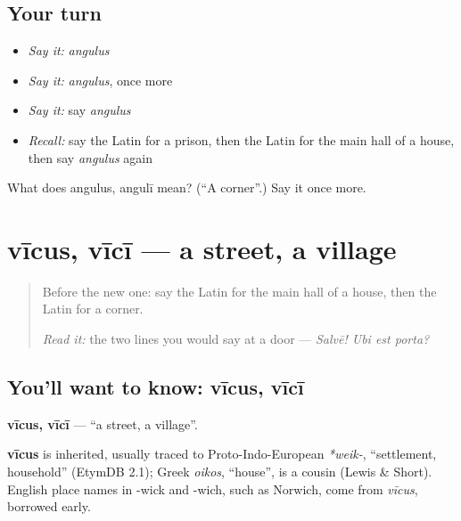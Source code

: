 \subsection*{Your turn}
\begin{itemize}
\raggedright
  \item \emph{Say it:} \emph{angulus}
  \item \emph{Say it:} \emph{angulus}, once more
  \item \emph{Say it:} say \emph{angulus}
  \item \emph{Recall:} say the Latin for a prison, then the Latin for the main hall of a house, then say \emph{angulus} again
\end{itemize}

\begin{tcolorbox}[breakable,colback=teal!4,colframe=teal!35!black,title={Before you move on}]
What does angulus, angulī mean? (\textquotedblleft{}A corner\textquotedblright{}.) Say it once more.
\end{tcolorbox}
\section[vīcus, vīcī]{vīcus, vīcī — a street, a village}

\label{lesson:LA-C116-vicus}



\begin{quote}
Before the new one: say the Latin for the main hall of a house, then the Latin for a corner.

\emph{Read it:} the two lines you would say at a door — \emph{Salvē! Ubi est porta?}
\end{quote}

\subsection*{You'll want to know: vīcus, vīcī}
\textbf{vīcus, vīcī} — \textquotedblleft{}a street, a village\textquotedblright{}.

\begin{cousinweb}
\textbf{vīcus} is inherited, usually traced to Proto-Indo-European \emph{*weik-}, \textquotedblleft{}settlement, household\textquotedblright{} (EtymDB 2.1); Greek \emph{oikos}, \textquotedblleft{}house\textquotedblright{}, is a cousin (Lewis \& Short). English place names in -wick and -wich, such as Norwich, come from \emph{vīcus}, borrowed early.
\end{cousinweb}

